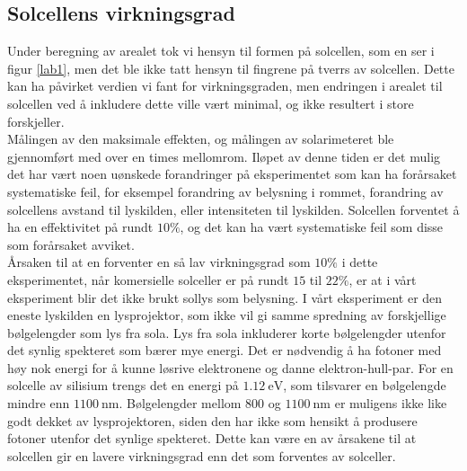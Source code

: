 \documentclass[%
 reprint,
 amsmath,amssymb,
 aps,
 norsk,
 booktabs
]{revtex4-1}
\begin{document}
\subsection{Solcellens virkningsgrad}
Under beregning av arealet tok vi hensyn til formen på solcellen, som en ser i figur \vref{lab1}, men det ble ikke tatt hensyn til fingrene på tverrs av solcellen. Dette kan ha påvirket verdien vi fant for virkningsgraden, men endringen i arealet til solcellen ved å inkludere dette ville vært minimal, og ikke resultert i store forskjeller.\\
Målingen av den maksimale effekten, og målingen av solarimeteret ble gjennomført med over en times mellomrom. Iløpet av denne tiden er det mulig det har vært noen uønskede forandringer på eksperimentet som kan ha forårsaket systematiske feil, for eksempel forandring av belysning i rommet, forandring av solcellens avstand til lyskilden, eller intensiteten til lyskilden. Solcellen forventet å ha en effektivitet på rundt $10\%$, og det kan ha vært systematiske feil som disse som forårsaket avviket.\\
Årsaken til at en forventer en så lav virkningsgrad som $10\%$ i dette eksperimentet, når komersielle solceller er på rundt $15$ til $22\%$, er at i vårt eksperiment blir det ikke brukt sollys som belysning. I vårt eksperiment er den eneste lyskilden en lysprojektor, som ikke vil gi samme spredning av forskjellige bølgelengder som lys fra sola. Lys fra sola inkluderer korte bølgelengder utenfor det synlig spekteret som bærer mye energi. Det er nødvendig å ha fotoner med høy nok energi for å kunne løsrive elektronene og danne elektron-hull-par. For en solcelle av silisium trengs det en energi på $\SI{1.12}{\electronvolt}$, som tilsvarer en bølgelengde mindre enn $\SI{1100}{\nano\meter}$. Bølgelengder mellom $800$ og $\SI{1100}{\nano\meter}$ er muligens ikke like godt dekket av lysprojektoren, siden den har ikke som hensikt å produsere fotoner utenfor det synlige spekteret. Dette kan være en av årsakene til at solcellen gir en lavere virkningsgrad enn det som forventes av solceller.
\end{document}
